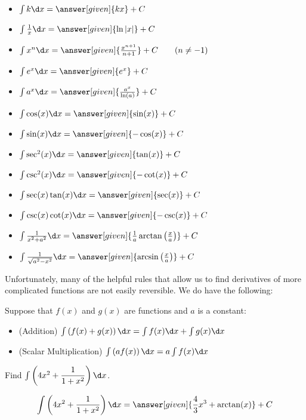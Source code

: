 \documentclass[nooutcomes]{ximera}
\begin{document}
\begin{theorem}\hfil
\begin{itemize}
\item $\int k \d x= \answer[given]{k x}+C$
\item $\int \frac{1}{x} \d x= \answer[given]{\ln|x|}+C$
\item $\int x^n \d x= \answer[given]{\frac{x^{n+1}}{n+1}}+C\qquad(n\ne-1)$
\item $\int e^x \d x= \answer[given]{e^x} + C$
\item $\int a^x \d x= \answer[given]{\frac{a^x}{\ln(a)}}+C$
\item $\int \cos(x) \d x = \answer[given]{\sin(x)} + C$
\item $\int \sin(x) \d x = \answer[given]{-\cos(x)} + C$  
\item $\int \sec^2(x) \d x = \answer[given]{\tan(x)} + C$
\item $\int \csc^2(x) \d x = \answer[given]{-\cot(x)} + C$
\item $\int \sec(x)\tan(x) \d x = \answer[given]{\sec(x)} + C$
\item $\int \csc(x)\cot(x) \d x = \answer[given]{-\csc(x)} + C$
\item $\int \frac{1}{x^2+a^2}\d x = \answer[given]{\frac{1}{a}\arctan\left(\frac{x}{a}\right)} + C$
\item $\int \frac{1}{\sqrt{a^2-x^2}}\d x= \answer[given]{\arcsin\left(\frac{x}{a}\right)}+C$
\end{itemize}
\end{theorem}


Unfortunately, many of the helpful rules that allow us to find derivatives of more complicated functions are not easily reversible.  We do have the following:

\begin{theorem} 
Suppose that $f(x)$ and $g(x)$ are functions and $a$ is a constant:
\begin{itemize}
\item (Addition) $\int \left(f(x) + g(x) \right) \d x = \int f(x) \d x+\int g(x)  \d x$
\item (Scalar Multiplication) $\int \left(a f(x)\right) \d x = a \int f(x) \d x$
\end{itemize}
\end{theorem}

\begin{question} 
  Find $\int \left(4x^2 + \dfrac{1}{1+x^2} \right)\d x$.
  \begin{prompt} 
    \[
    \int \left(4x^2 + \dfrac{1}{1+x^2} \right) \d x  = \answer[given]{\frac{4}{3} x^3 + \arctan(x)} +C 
    \]
  \end{prompt}
\end{question}
\end{document}
